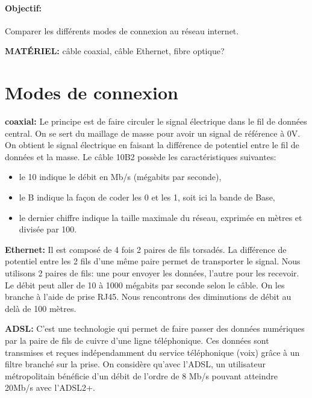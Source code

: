 \documentclass[a4paper,11pt]{article}
\begin{document}
\begin{Form}
\paragraph{Objectif:}Comparer les différents modes de connexion au réseau internet.
\begin{commentprof}
\noindent\textbf{MATÉRIEL:} câble coaxial, câble Ethernet, fibre optique?\\
\end{commentprof}
\section{Modes de connexion}
\begin{framed}
\textbf{coaxial:} Le principe est de faire circuler le signal électrique dans le fil de données central. On se sert du maillage de masse pour avoir un signal de référence à 0V. On obtient le signal électrique en faisant la différence de potentiel entre le fil de données et la masse. Le câble 10B2 possède les caractéristiques suivantes:
\begin{itemize}
\item le 10 indique le débit en Mb/s (mégabits par seconde),
\item le B indique la façon de coder les 0 et les 1, soit ici la bande de Base,
\item le dernier chiffre indique la taille maximale du réseau, exprimée en mètres et divisée par 100.
\end{itemize}
\end{framed}
\begin{framed}
\textbf{Ethernet:} Il est composé de 4 fois 2 paires de fils torsadés. La différence de potentiel entre les 2 fils d'une même paire permet de transporter le signal. Nous utilisons 2 paires de fils: une pour envoyer les données, l'autre pour les recevoir. Le débit peut aller de 10 à 1000 mégabits par seconde selon le câble. On les branche à l'aide de prise RJ45. Nous rencontrons des diminutions de débit au delà de 100 mètres.
\end{framed}
\begin{framed}
\textbf{ADSL:} C'est une technologie qui permet de faire passer des données numériques par la paire de fils de cuivre d’une ligne téléphonique. Ces données sont transmises et reçues indépendamment du service téléphonique (voix) grâce à un filtre branché sur la prise. On considère qu’avec l’ADSL, un utilisateur métropolitain bénéficie d’un débit de l’ordre de 8 Mb/s pouvant atteindre 20Mb/s avec l'ADSL2+.

\end{framed}
\end{Form}
\end{document}

